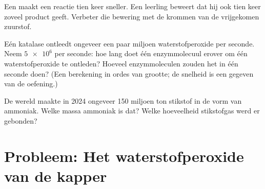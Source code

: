 \begin{exercise}[$\star\star\star$]\label{exo:g12:catalysis:13}
Een  maakt een reactie tien keer sneller. Een leerling beweert
dat hij ook tien keer zoveel product geeft. Verbeter die bewering met de
krommen van de vrijgekomen zuurstof.
\end{exercise}

\begin{exercise}[$\star\star\star$]\label{exo:g12:catalysis:14}
Eén  katalase ontleedt ongeveer een paar miljoen 
waterstofperoxide per seconde. Neem $\num{5e6}$ per seconde: hoe lang doet
één enzymmolecuul erover om één  waterstofperoxide te ontleden? Hoeveel
enzymmoleculen zouden het in één seconde doen? (Een berekening in ordes
van grootte; de snelheid is een gegeven van de oefening.)
\end{exercise}

\begin{exercise}[$\star\star\star$]\label{exo:g12:catalysis:15}
De wereld maakte in 2024 ongeveer 150 miljoen ton stikstof in de vorm van
ammoniak. Welke massa ammoniak is dat? Welke hoeveelheid stikstofgas
werd er gebonden?
\end{exercise}

\section{Probleem: Het waterstofperoxide van de kapper}

